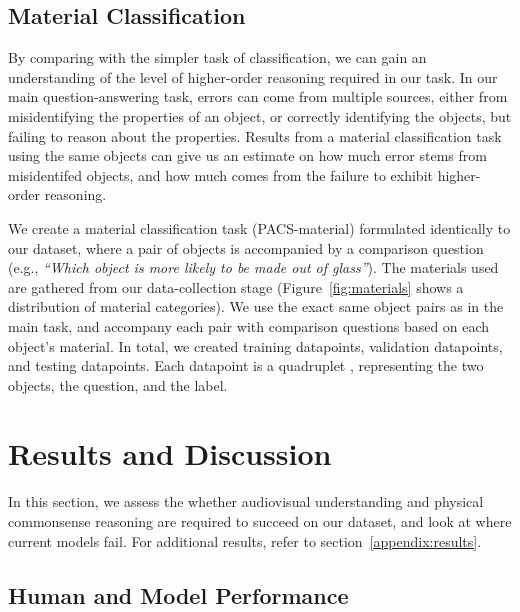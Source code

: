 \documentclass[runningheads]{llncs}
\newcommand{\names}{\textsc{PACS}}
\begin{document}
\subsection{Material Classification} \label{sec:material}


By comparing with the simpler task of classification, we can gain an understanding of the level of higher-order reasoning required in our task. In our main question-answering task, errors can come from multiple sources, either from misidentifying the properties of an object, or correctly identifying the objects, but failing to reason about the properties. Results from a material classification task using the same objects can give us an estimate on how much error stems from misidentifed objects, and how much comes from the failure to exhibit higher-order reasoning.

We create a material classification task (\names-material) formulated identically to our dataset, where a pair of objects is accompanied by a comparison question (e.g., \textit{``Which object is more likely to be made out of glass''}). The materials used are gathered from our data-collection stage (Figure~\ref{fig:materials} shows a distribution of material categories). We use the exact same object pairs as in the main task, and accompany each pair with comparison questions based on each object's material.
In total, we created  training datapoints,  validation datapoints, and  testing datapoints. Each datapoint is a quadruplet , representing the two objects, the question, and the label.


\section{Results and Discussion}
\label{sec:results}


In this section, we assess the whether audiovisual understanding and physical commonsense reasoning are required to succeed on our dataset, and look at where current models fail. For additional results, refer to section~\ref{appendix:results}. 

\subsection{Human and Model Performance}
\end{document}
